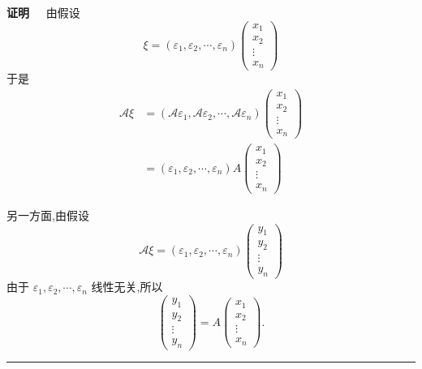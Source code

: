\documentclass[13pt]{beamer}
\def\qed{\nopagebreak\hfill{\rule{4pt}{7pt}}\medbreak}
\def\pf{{\bf 证明~~ }}
\def\A{\mathscr{A}}
\begin{document}
\begin{frame}
\pf 由假设
\[
\xi=\left(\varepsilon_{1}, \varepsilon_{2}, \cdots, \varepsilon_{n}\right)\left(\begin{array}{c}
x_{1} \\
x_{2} \\
\vdots \\
x_{n}
\end{array}\right)
\]
于是
\begin{align*}
\A \xi & =\left(\A \varepsilon_{1}, \A \varepsilon_{2}, \cdots, \A \varepsilon_{n}\right)\left(\begin{array}{c}
x_{1} \\
x_{2} \\
\vdots \\
x_{n}
\end{array}\right) \\
& =\left(\varepsilon_{1}, \varepsilon_{2}, \cdots, \varepsilon_{n}\right) A\left(\begin{array}{c}
x_{1} \\
x_{2} \\
\vdots \\
x_{n}
\end{array}\right)
\end{align*}

\end{frame}


\begin{frame}
另一方面,由假设
\[
\A \xi=\left(\varepsilon_{1}, \varepsilon_{2}, \cdots, \varepsilon_{n}\right)\left(\begin{array}{c}
y_{1} \\
y_{2} \\
\vdots \\
y_{n}
\end{array}\right)
\]
由于 ${\varepsilon}_{1}, {\varepsilon}_{2}, \cdots, {\varepsilon}_{n}$ 线性无关,所以
\[
\left(\begin{array}{c}
y_{1} \\
y_{2} \\
\vdots \\
y_{n}
\end{array}\right)=A\left(\begin{array}{c}
x_{1} \\
x_{2} \\
\vdots \\
x_{n}
\end{array}\right) .
\]
\qed

\end{frame}
\end{document}
